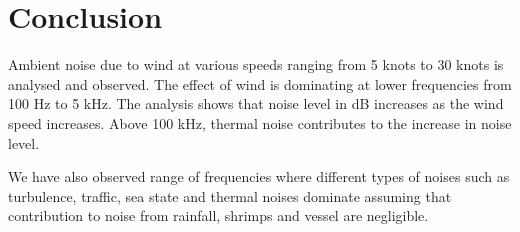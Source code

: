 \chapter*{Conclusion}

\noindent Ambient noise due to wind at various speeds ranging from 5 knots to 30 knots is analysed and observed. The effect of wind is dominating at lower frequencies from 100 Hz to 5 kHz. The analysis shows that noise level in dB increases as the wind speed increases. Above 100 kHz, thermal noise contributes to the increase in noise level. 

\noindent We have also observed range of frequencies where different types of noises such as turbulence, traffic, sea state and thermal noises dominate assuming that contribution to noise from rainfall, shrimps and vessel are negligible. 

